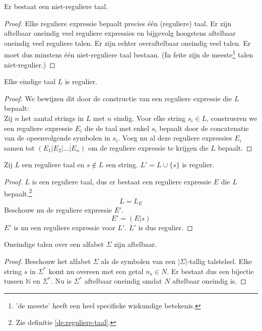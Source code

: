 \documentclass[main.tex]{subfiles}
\begin{document}
\begin{st}
  Er bestaat een niet-reguliere taal.

  \begin{proof}
    Elke reguliere expressie bepaalt precies \'e\'en (reguliere) taal.
    Er zijn aftelbaar oneindig veel reguliere expressies en bijgevolg hoogstens aftelbaar oneindig veel reguliere talen.
    Er zijn echter overaftelbaar oneindig veel talen. Er moet dus minstens \'e\'en niet-reguliere taal bestaan.
    (In feite zijn de meeste\footnote{'de meeste' heeft een heel specifieke wiskundige betekenis.} talen niet-regulier.)
  \end{proof}
\end{st}

\begin{st}
  Elke eindige taal $L$ is regulier.

  \begin{proof}
    We bewijzen dit door de constructie van een reguliere expressie die $L$ bepaalt:\\
    Zij $n$ het aantal strings in $L$ met $n$ eindig.
    Voor elke string $s_{i} \in L$, construeren we een reguliere expressie $E_{i}$ die de taal met enkel $s_{i}$ bepaalt door de concatenatie van de opeenvolgende symbolen in $s_{i}$. 
    Voeg nu al deze reguliere expressies $E_{i}$ samen tot $(E_{1}|E_{2}|\ldots|E_{n})$ om de reguliere expressie te krijgen die $L$ bepaalt.
  \end{proof}
\end{st}

\begin{st}
  Zij $L$ een reguliere taal en $s \not \in L$ een string.
  $L' = L \cup \{s\}$ is regulier.
  \begin{proof}
    $L$ is een reguliere taal, dus er bestaat een reguliere expressie $E$ die $L$ bepaalt.\footnote{Zie definitie \ref{de:reguliere-taal}.}
    \[ L = L_{E} \]
    Beschouw nu de reguliere expressie $E'$.
    \[ E' = (E | s) \]
    $E'$ is nu een reguliere expressie voor $L'$. 
    $L'$ is dus regulier.
  \end{proof}
\end{st}

\begin{st}
  \label{sigma-ster-aftelbaar}
  Oneindige talen over een alfabet $\Sigma$ zijn aftelbaar.

  \begin{proof}
    Beschouw het alfabet $\Sigma$ als de symbolen van een $|\Sigma|$-tallig talstelsel.
    Elke string $s$ in $\Sigma^{*}$ komt nu overeen met een getal $n_{s} \in N$.
    Er bestaat dus een bijectie tussen $\mathbb N$ en $\Sigma^{*}$. 
    Nu is $\Sigma^{*}$ aftelbaar oneindig omdat $N$ aftelbaar oneindig is.
  \end{proof}
\end{st}
\end{document}
